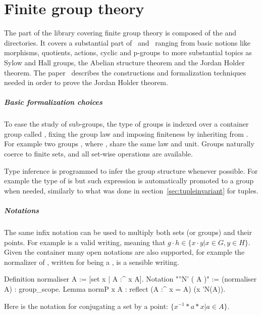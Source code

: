 \chapter{Finite group theory}

The part of the library covering finite group theory is composed of
the  and  directories.  It covers a substantial
part of~\cite{gorenstein2007finite} and~\cite{9781139175319} ranging from
basic notions like morphisms, quotients, actions, cyclic and p-groups to more
substantial topics as Sylow and Hall groups, the Abelian
structure theorem and the Jordan Holder theorem.
The paper~\cite{DBLP:conf/mkm/Mahboubi13}
describes the constructions and formalization techniques
needed in order to prove the Jordan Holder theorem.

\paragraph{Basic formalization choices} To ease the study of sub-groups,
the type of groups is indexed over a container group called
, fixing the group law and imposing finiteness by
inheriting from .
For example two groups ,
where , share the same law and unit.  Groups
naturally coerce to finite sets, and all set-wise operations are available.

Type inference is programmed to infer the group structure whenever possible.
For example the type of  is  but such expression
is automatically promoted to a group when needed, similarly to what 
was done in section~\ref{sec:tupleinvariant} for tuples.

\paragraph{Notations} The same infix \C{*} notation can be used to
multiply both sets (or groups) and their points.  For example
 is a valid writing, meaning that
$g\cdot h \in \{ x\cdot y | x \in G, y \in H\}$.  Given the 
container many open notations are also supported, for example the normalizer
of , written  for  being a , is a sensible
writing.

\begin{coq}{}{}
Definition normaliser A := [set x | A :^ x \subset A].
Notation "''N' ( A )" := (normaliser A) : group_scope.
Lemma normP x A : reflect (A :^ x = A) (x \in 'N(A)).
\end{coq}
Here \C{:^} is the notation for conjugating a set by a point:
$\{x^{-1}*a*x | a\in A\}$.

